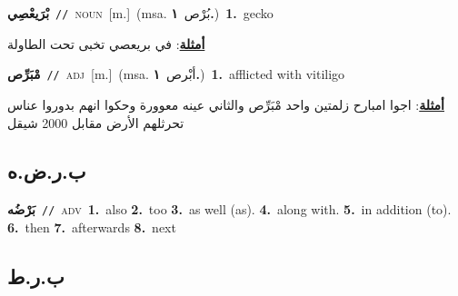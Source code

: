 \documentclass[10pt,a4paper,twoside]{article} %
\begin{document}
\begin{multicols}{2}
{\setlength\topsep{0pt}\textbf{\foreignlanguage{arabic}{بْرَيعْصِي}}\ {\color{gray}\texttt{//}\color{black}}\ \textsc{noun}\ [m.]\ \color{gray}(msa. \foreignlanguage{arabic}{بُرْص}~\foreignlanguage{arabic}{\textbf{١.}})\color{black}\ \textbf{1.}~gecko\  \begin{flushright}\color{gray}\foreignlanguage{arabic}{\textbf{\underline{\foreignlanguage{arabic}{أمثلة}}}: في بريعصي تخبى تحت الطاولة}\end{flushright}\color{black}} \vspace{2mm}

{\setlength\topsep{0pt}\textbf{\foreignlanguage{arabic}{مْبَرِّص}}\ {\color{gray}\texttt{//}\color{black}}\ \textsc{adj}\ [m.]\ \color{gray}(msa. \foreignlanguage{arabic}{أبْرص}~\foreignlanguage{arabic}{\textbf{١.}})\color{black}\ \textbf{1.}~afflicted with vitiligo\  \begin{flushright}\color{gray}\foreignlanguage{arabic}{\textbf{\underline{\foreignlanguage{arabic}{أمثلة}}}: اجوا امبارح زلمتين واحد مْبَرِّص والثاني عينه معوورة وحكوا انهم بدوروا عناس تحرثلهم الأرض مقابل 2000 شيقل}\end{flushright}\color{black}} \vspace{2mm}

\vspace{-3mm}
\subsection*{\color{blue}\foreignlanguage{arabic}{ب.ر.ض.ه}\color{blue}{ (ntws)}} 

{\setlength\topsep{0pt}\textbf{\foreignlanguage{arabic}{بَرْضُه}}\ {\color{gray}\texttt{//}\color{black}}\ \textsc{adv}\ \textbf{1.}~also  \textbf{2.}~too  \textbf{3.}~as well (as).  \textbf{4.}~along with.  \textbf{5.}~in addition (to).  \textbf{6.}~then  \textbf{7.}~afterwards  \textbf{8.}~next\ } \vspace{2mm}

\vspace{-3mm}
\subsection*{\color{blue}\foreignlanguage{arabic}{ب.ر.ط}\color{blue}{}} 


\end{multicols}
\end{document}
